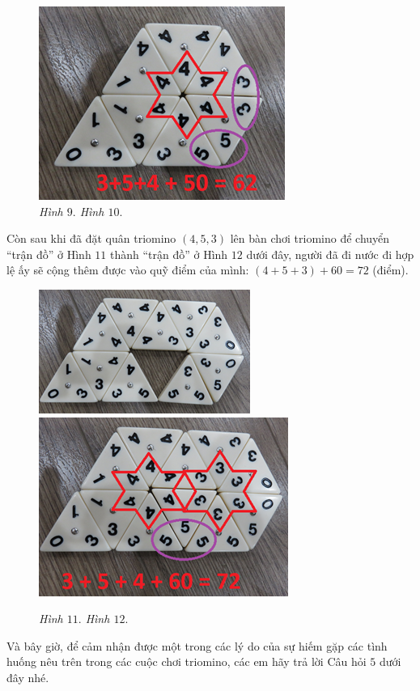 {\begin{figure}[H]
		\includegraphics[height=0.3\textwidth]{h10a}
			\caption{\textit{\small Hình $9.$ \hspace*{75pt} Hình $10.$}}
	\end{figure}
	Còn sau khi đã đặt quân triomino $(4, 5, 3)$ lên bàn chơi triomino để chuyển “trận đồ” ở Hình $11$ thành “trận đồ” ở Hình $12$ dưới đây, người đã đi nước đi hợp lệ ấy sẽ cộng thêm được vào quỹ điểm của mình:
	\vskip 0.1cm
	\hspace*{40pt} $(4+5+3)+60=72$ (điểm).
	\vskip 0.1cm
	\begin{figure}[H]
		\centering
		\vspace*{-5pt}
		\captionsetup{labelformat=empty, justification=centering}
		\includegraphics[height=0.25\textwidth]{h11a}\quad
		\includegraphics[height=0.25\textwidth]{h12a}
		\caption{\textit{\small Hình $11.$ \hspace*{75pt} Hình $12.$}}
		\vspace*{-5pt}
	\end{figure}
	Và bây giờ, để cảm nhận được một trong các lý do của sự hiếm gặp các tình huống nêu trên trong các cuộc chơi triomino, các em hãy trả lời Câu hỏi $5$ dưới đây nhé.
	\vskip 0.1cm
	\begin{multicols}{2}

\end{multicols}}

